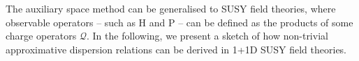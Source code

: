 \documentclass{article}
\theoremstyle{definition}
\begin{document}
The auxiliary space method can be generalised to SUSY field theories, where observable operators -- such as H and P -- can be defined as the products of some charge operators $\mathcal{Q}$. In the following, we present a sketch of how non-trivial approximative dispersion relations can be derived in 1+1D SUSY field theories.

\end{document}

